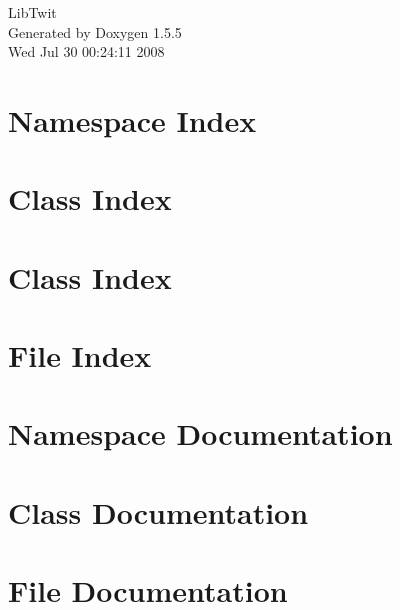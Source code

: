 \documentclass[a4paper]{book}
\begin{document}
\begin{titlepage}
\vspace*{7cm}
\begin{center}
{\Large LibTwit }\\
\vspace*{1cm}
{\large Generated by Doxygen 1.5.5}\\
\vspace*{0.5cm}
{\small Wed Jul 30 00:24:11 2008}\\
\end{center}
\end{titlepage}
\clearemptydoublepage
{}
\tableofcontents
\clearemptydoublepage
{}
\chapter{Namespace Index}

\chapter{Class Index}

\chapter{Class Index}

\chapter{File Index}

\chapter{Namespace Documentation}

\chapter{Class Documentation}









\chapter{File Documentation}







\printindex
\end{document}
